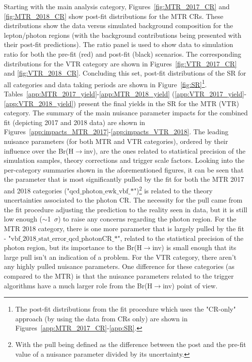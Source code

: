 \hspace{10pt} Starting with the main analysis category, Figures~\ref{fig:MTR_2017_CR} and \ref{fig:MTR_2018_CR} show post-fit distributions for the MTR CRs. These distributions show the data versus simulated background composition for the lepton/photon regions (with the background contributions being presented with their post-fit predictions). The ratio panel is used to show data to simulation ratio for both the pre-fit (red) and post-fit (black) scenarios. The corresponding distributions for the VTR category are shown in Figures~\ref{fig:VTR_2017_CR} and \ref{fig:VTR_2018_CR}. Concluding this set, post-fit distributions of the SR for all categories and data taking periods are shown in Figure~\ref{fig:SR}\footnote{The post-fit distributions from the fit procedure which uses the "CR-only" approach (by using the data from CRs only) are shown in Figures~\ref{app:MTR_2017_CR}-\ref{app:SR}.}. Tables~\ref{app:MTR_2017_yield}-\ref{app:MTR_2018_yield} (\ref{app:VTR_2017_yield}-\ref{app:VTR_2018_yield}) present the final yields in the SR for the MTR (VTR) category. The summary of the main nuisance parameter impacts for the combined fit (depicting 2017 and 2018 data) are shown in Figures~\ref{app:impacts_MTR_2017}-\ref{app:impacts_VTR_2018}. The leading nuisance parameters (for both MTR and VTR categories), ordered by their influence over the Br(H$\rightarrow$inv), are the ones related to statistical precision of the simulation samples, theory corrections and trigger scale factors. Looking into the per-category summaries shown in the aforementioned figures, it can be seen that the parameter that is most significantly pulled by the fit for both the MTR 2017 and 2018 categories ("$\text{qcd\_photon\_ewk\_vbf\_*}$")\footnote{With the pull being defined as the difference between the post and the pre-fit value of a nuisance parameter divided by its uncertainty.} is related to the theory uncertainties associated to the photon CR. The necessity for the pull came from the fit procedure adjusting the prediction to the reality seen in data, but it is still low enough ($\sim$1~$\sigma$) to raise any concerns regarding the photon region. For the MTR 2018 category, there is one more parameter that is largely pulled by the fit - "$\text{vbf\_2018\_stat\_error\_qcd\_photonCR\_*}$", related to the statistical precision of the photon region, but its importance to the Br(H$\rightarrow$inv) is small enough that its large pull isn't an indication of a problem. For the VTR category, there aren't any highly pulled nuisance parameters. One difference for these categories (as compared to the MTR) is that the nuisance parameters related to the trigger algorithms have a much larger role from the Br(H$\rightarrow$inv) point of view.


